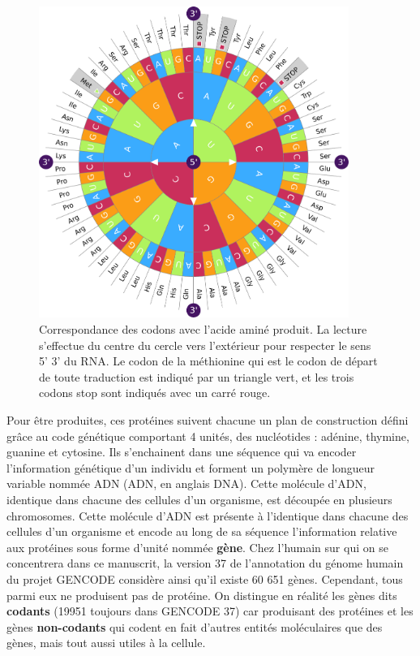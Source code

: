 \begin{figure}[ht]
    \centering
    \includegraphics[width=0.9\textwidth]{img/intro/1_context/intro_1_code_genetique.pdf}
    \caption[Correspondance des codons avec l'acide aminé produit.]{Correspondance des codons avec l'acide aminé produit. La lecture s'effectue du centre du cercle vers l'extérieur pour respecter le sens 5' \textrightarrow{} 3' du \acrshort{RNA}. Le codon de la méthionine qui est le codon de départ de toute traduction est indiqué par un triangle vert, et les trois codons stop sont indiqués avec un carré rouge.}
    \label{fig:intro_code_genetique}
\end{figure}


Pour être produites, ces protéines suivent chacune un plan de construction défini grâce au code génétique comportant 4 unités, des nucléotides : adénine, thymine, guanine et cytosine. Ils s'enchainent dans une séquence qui va encoder l'information génétique d'un individu et forment un polymère de longueur variable nommée \acrlong{ADN} (\acrshort{ADN}, en anglais \acrshort{DNA}). Cette molécule d'\acrshort{ADN}, identique dans chacune des cellules d'un organisme, est découpée en plusieurs chromosomes. Cette molécule d'\acrshort{ADN} est présente à l'identique dans chacune des cellules d'un organisme et encode au long de sa séquence l'information relative aux protéines sous forme d'unité nommée \textbf{gène}. Chez l'humain sur qui on se concentrera dans ce manuscrit, la version 37 de l'annotation du génome humain du projet GENCODE \cite{Frankish2019Jan} considère ainsi qu'il existe 60 651 gènes. Cependant, tous parmi eux ne produisent pas de protéine. On distingue en réalité les gènes dits \textbf{codants} (19951 toujours dans GENCODE 37) car produisant des protéines et les gènes \textbf{non-codants} qui codent en fait d'autres entités moléculaires que des gènes, mais tout aussi utiles à la cellule.

